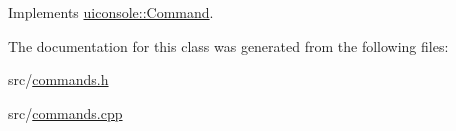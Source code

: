 Implements \hyperlink{classuiconsole_1_1Command_a5c4d205b1de13a6b3d0db73ddc7ebefa}{uiconsole::Command}.



The documentation for this class was generated from the following files:\begin{DoxyCompactItemize}
\item 
src/\hyperlink{commands_8h}{commands.h}\item 
src/\hyperlink{commands_8cpp}{commands.cpp}\end{DoxyCompactItemize}
